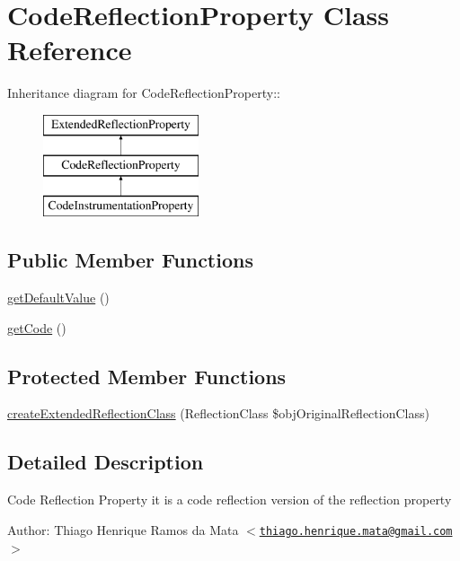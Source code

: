 \hypertarget{class_code_reflection_property}{
\section{CodeReflectionProperty Class Reference}
\label{class_code_reflection_property}
}
Inheritance diagram for CodeReflectionProperty::\begin{figure}[H]
\begin{center}
\leavevmode
\includegraphics[height=3cm]{class_code_reflection_property}
\end{center}
\end{figure}
\subsection*{Public Member Functions}
\begin{CompactItemize}
\item 
\hyperlink{class_code_reflection_property_f9b9401c63918169457fe8516324950f}{getDefaultValue} ()
\item 
\hyperlink{class_code_reflection_property_b5e24da53b4a0d0848b18c1e832f47ff}{getCode} ()
\end{CompactItemize}
\subsection*{Protected Member Functions}
\begin{CompactItemize}
\item 
\hyperlink{class_code_reflection_property_6b56ec198bc6a5b5a72076e4e7c19e29}{createExtendedReflectionClass} (ReflectionClass \$objOriginalReflectionClass)
\end{CompactItemize}


\subsection{Detailed Description}
Code Reflection Property it is a code reflection version of the reflection property

\begin{Desc}
\item[Author:]Thiago Henrique Ramos da Mata $<$\href{mailto:thiago.henrique.mata@gmail.com}{\tt thiago.henrique.mata@gmail.com}$>$ \end{Desc}


